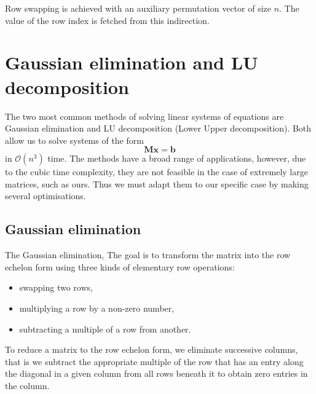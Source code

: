 \documentclass[12pt, a4paper]{article}
\newcommand{\bigO}{\mathcal{O}}
\begin{document}
Row swapping is achieved with an auxiliary permutation vector of size $n$. The
value of the row index is fetched from this indirection.

\section{Gaussian elimination and LU decomposition}
The two most common methods of solving linear systems of equations are Gaussian
elimination and LU decomposition (Lower Upper decomposition). Both allow us to
solve systems of the form
\begin{equation*}
  \bm{M}\bm{x} = \bm{b}
\end{equation*}
in $\bigO(n^3)$ time. The methods have a broad range of applications, however,
due to the cubic time complexity, they are not feasible in the case of extremely
large matrices, such as ours. Thus we must adapt them to our specific case by
making several optimisations.

\subsection{Gaussian elimination}
The Gaussian elimination,
The goal is to transform the matrix into the row echelon form using three kinds
of elementary row operations:
\begin{itemize}
  \item swapping two rows,
  \item multiplying a row by a non-zero number,
  \item subtracting a multiple of a row from another.
\end{itemize}

To reduce a matrix to the row echelon form, we eliminate successive columns,
that is we subtract the appropriate multiple of the row that has an entry along
the diagonal in a given column from all rows beneath it to obtain zero entries
in the column.
\end{document}
